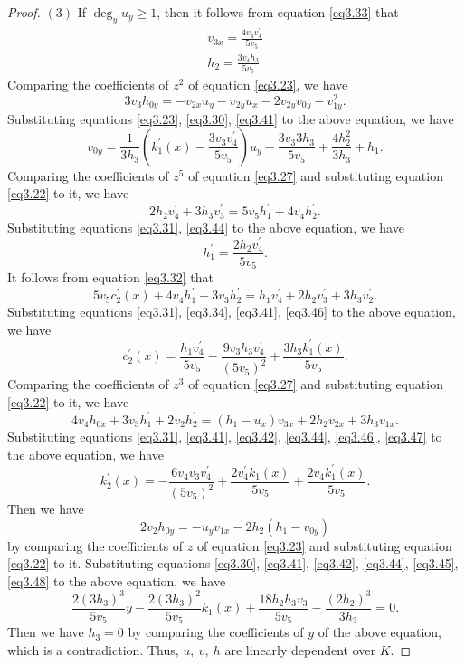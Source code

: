 \documentclass[12pt, twoside, leqno]{article}
\theoremstyle{definition}
\numberwithin{equation}{section}
\begin{document}
\begin{proof}
$(3)$ If $\deg_yu_y\geq 1$, then it follows from equation \eqref{eq3.33} that
\begin{eqnarray}\label{eq3.44}
v_{3x}=\frac{4v_4v_4^{'}}{5v_5}\\\nonumber
h_2=\frac{3v_4h_3}{5v_5}
\end{eqnarray}
Comparing the coefficients of $z^2$ of equation \eqref{eq3.23}, we have
$$3v_{3}h_{0y}=-v_{2x}u_{y}-v_{2y}u_x-2v_{2y}v_{0y}-v_{1y}^2.$$
Substituting equations \eqref{eq3.23}, \eqref{eq3.30}, \eqref{eq3.41} to the above equation, we have
\begin{equation}\label{eq3.45}
v_{0y}=\frac{1}{3h_{3}}\left( k_{1}^{'}(x)-\frac{3v_{3}v_{4}^{'}}{5v_{5}}\right) u_{y}-\frac{3v_{3}3h_{3}}{5v_{5}}+\frac{4h_2^2}{3h_{3}}+h_1.
\end{equation}
Comparing the coefficients of $z^5$ of equation \eqref{eq3.27} and substituting equation \eqref{eq3.22} to it, we have
$$2h_2v_4^{'}+3h_3v_3^{'}=5v_5h_1^{'}+4v_4h_2^{'}.$$
Substituting equations \eqref{eq3.31}, \eqref{eq3.44} to the above equation, we have
\begin{equation}\label{eq3.46}
h_1^{'}=\frac{2h_2v_4^{'}}{5v_5}.
\end{equation}
It follows from equation \eqref{eq3.32} that
$$5v_5c_2^{'}(x)+4v_4h_1^{'}+3v_3h_2^{'}=h_1v_4^{'}+2h_2v_3^{'}+3h_3v_2^{'}.$$
Substituting equations \eqref{eq3.31}, \eqref{eq3.34}, \eqref{eq3.41}, \eqref{eq3.46} to the above equation, we have
\begin{equation}\label{eq3.47}
c_2^{'}(x)=\frac{h_1v_4^{'}}{5v_5}-\frac{9v_3h_3v_4^{'}}{(5v_5)^2}+\frac{3h_3k_1^{'}(x)}{5v_5}.
\end{equation}
Comparing the coefficients of $z^3$ of equation \eqref{eq3.27} and substituting equation \eqref{eq3.22} to it, we have
$$4v_{4}h_{0x}+3v_{3}h_{1}^{'}+2v_{2}h_{2}^{'}=(h_{1}-u_{x})v_{3x}+2h_{2}v_{2x}+3h_{3}v_{1x}.$$
Substituting equations \eqref{eq3.31}, \eqref{eq3.41}, \eqref{eq3.42}, \eqref{eq3.44}, \eqref{eq3.46}, \eqref{eq3.47} to the above equation, we have
\begin{equation}\label{eq3.48}
k_{2}^{'}(x)=-\frac{6v_{4}v_{3}v_{4}^{'}}{(5v_5)^{2}}+\frac{2v_{4}^{'} k_{1}(x)}{5v_{5}}+\frac{2v_{4}k_{1}^{'}(x)}{5v_{5}}.
\end{equation}
Then we have
\begin{equation}\nonumber
2v_{2}h_{0y}=-u_{y}v_{1x}-2h_{2}(h_{1}-v_{0y})
\end{equation}
by comparing the coefficients of $z$ of equation \eqref{eq3.23} and substituting equation \eqref{eq3.22} to it. Substituting equations \eqref{eq3.30}, \eqref{eq3.41}, \eqref{eq3.42}, \eqref{eq3.44}, \eqref{eq3.45}, \eqref{eq3.48} to the above equation, we have
$$\frac{2(3h_3)^3}{5v_5}y-\frac{2(3h_3)^2}{5v_5}k_1(x)+\frac{18h_2h_3v_3}{5v_5}-\frac{(2h_2)^3}{3h_3}=0.$$
Then we have $h_3=0$ by comparing the coefficients of $y$ of the above equation, which is a contradiction. Thus, $u,~v,~h$ are linearly dependent over $K$.


\end{proof}
\end{document}
